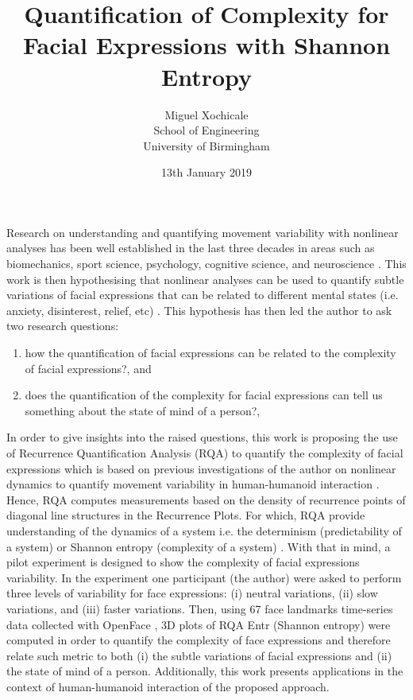 \documentclass[12pt]{article}
\title{
Quantification of Complexity for \\
Facial Expressions with Shannon Entropy
}
\author{Miguel Xochicale \\
School of Engineering \\
University of Birmingham}
\date{13th January 2019}
\begin{document}
\maketitle
\thispagestyle{empty} %

Research on understanding and quantifying movement variability 
with nonlinear analyses has been well established in the last three 
decades in areas such as biomechanics, sport science, psychology, 
cognitive science, and neuroscience \cite{davids2003}.
This work is then hypothesising that nonlinear analyses 
can be used to quantify subtle variations of facial expressions 
that can be related to different mental states 
(i.e. anxiety, disinterest, relief, etc) \cite{back2014}.
This hypothesis has then led the author to ask two research questions: 
\begin{enumerate}[label=(\roman*)]
\item how the quantification of facial expressions can be related to  
	the complexity of facial expressions?, and 
\item does the quantification of the complexity for facial expressions 
	can tell us something about the state of mind of a person?, 
\end{enumerate}


In order to give insights into the raised questions,
this work is proposing 
the use of Recurrence Quantification Analysis (RQA) 
to quantify the complexity of facial expressions 
which is based on previous investigations of the author 
on nonlinear dynamics to quantify movement variability 
in human-humanoid interaction \cite{XochicalePhDThesis2018}.
Hence, RQA computes measurements based on the density of 
recurrence points of diagonal line 
structures in the Recurrence Plots.
For which, RQA provide understanding of the dynamics of a system i.e. 
the determinism (predictability of a system) or 
Shannon entropy (complexity of a system) \cite{marwan2007}.
With that in mind, a pilot experiment is designed 
to show the complexity of facial expressions variability. 
In the experiment one participant (the author) 
were asked to perform 
three levels of variability for face expressions:
(i) neutral variations, (ii) slow variations, and (iii) faster variations.
Then, using 67 face landmarks time-series data collected 
with OpenFace \cite{baltrusaitis2018}, 3D plots
of RQA Entr (Shannon entropy) were computed in order
to quantify the complexity of face expressions and 
therefore relate such metric 
to both (i) the subtle variations of facial expressions 
and (ii) the state of mind of a person. Additionally,
this work presents applications in the context of 
human-humanoid interaction of the proposed approach.




\end{document}
